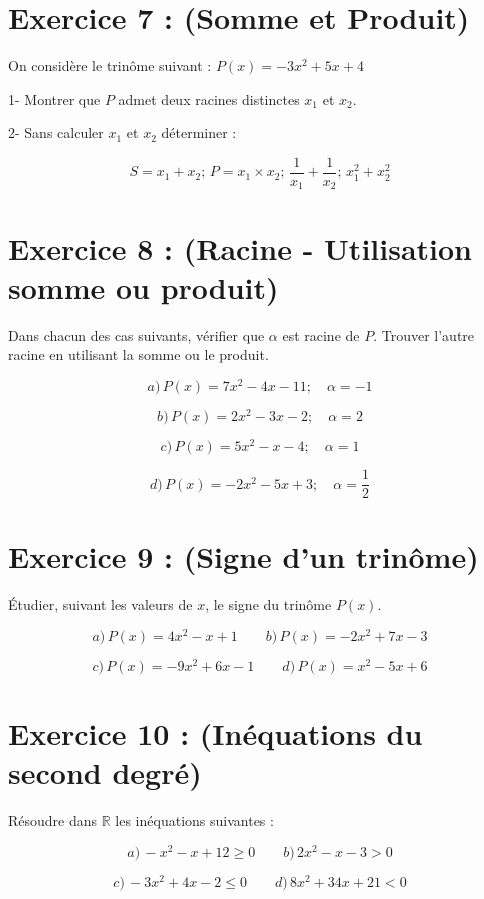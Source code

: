\documentclass[12pt]{article}
\begin{document}
\section*{Exercice 7 : (Somme et Produit)}

On considère le trinôme suivant : \( P(x) = -3x^2 + 5x + 4 \)

1- Montrer que \( P \) admet deux racines distinctes \( x_1 \) et \( x_2 \).

2- Sans calculer \( x_1 \) et \( x_2 \) déterminer :

\[
S = x_1 + x_2 ; \, P = x_1 \times x_2 ; \, \frac{1}{x_1} + \frac{1}{x_2} ; \, x_1^2 + x_2^2
\]

\section*{Exercice 8 : (Racine - Utilisation somme ou produit)}

Dans chacun des cas suivants, vérifier que \( \alpha \) est racine de \( P \). Trouver l’autre racine en utilisant la somme ou le produit.

\[
a) \, P(x) = 7x^2 - 4x - 11 ; \quad \alpha = -1
\]

\[
b) \, P(x) = 2x^2 - 3x - 2 ; \quad \alpha = 2
\]

\[
c) \, P(x) = 5x^2 - x - 4 ; \quad \alpha = 1
\]

\[
d) \, P(x) = -2x^2 - 5x + 3 ; \quad \alpha = \frac{1}{2}
\]

\section*{Exercice 9 : (Signe d’un trinôme)}

Étudier, suivant les valeurs de \( x \), le signe du trinôme \( P(x) \).

\[
a) \, P(x) = 4x^2 - x + 1 \quad\quad b) \, P(x) = -2x^2 + 7x - 3
\]

\[
c) \, P(x) = -9x^2 + 6x - 1 \quad\quad d) \, P(x) = x^2 - 5x + 6
\]

\section*{Exercice 10 : (Inéquations du second degré)}

Résoudre dans \(\mathbb{R}\) les inéquations suivantes :

\[
a) \, -x^2 - x + 12 \geq 0 \quad\quad b) \, 2x^2 - x - 3 > 0
\]

\[
c) \, -3x^2 + 4x - 2 \leq 0 \quad\quad d) \, 8x^2 + 34x + 21 < 0
\]
\end{document}
